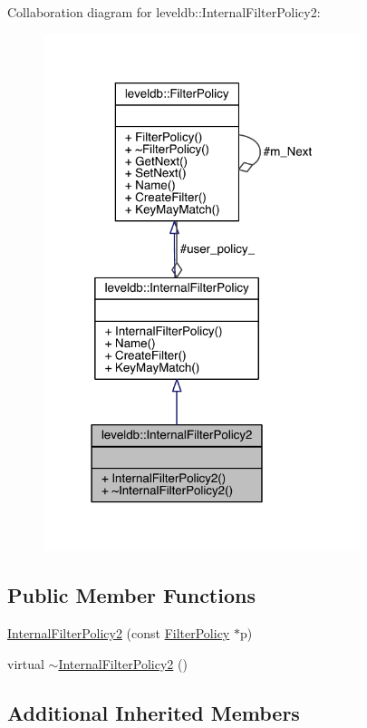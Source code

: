 Collaboration diagram for leveldb\+:\+:Internal\+Filter\+Policy2\+:\nopagebreak
\begin{figure}[H]
\begin{center}
\leavevmode
\includegraphics[width=262pt]{classleveldb_1_1_internal_filter_policy2__coll__graph}
\end{center}
\end{figure}
\subsection*{Public Member Functions}
\begin{DoxyCompactItemize}
\item 
\hyperlink{classleveldb_1_1_internal_filter_policy2_ae3839b7b978d0c92ab46ae5ee1050253}{Internal\+Filter\+Policy2} (const \hyperlink{classleveldb_1_1_filter_policy}{Filter\+Policy} $\ast$p)
\item 
virtual \hyperlink{classleveldb_1_1_internal_filter_policy2_a8c874cbb93feeeef4799faf5ec51964d}{$\sim$\+Internal\+Filter\+Policy2} ()
\end{DoxyCompactItemize}
\subsection*{Additional Inherited Members}


